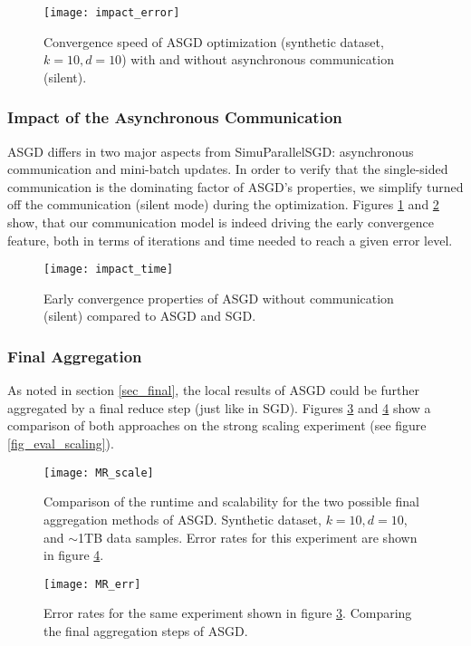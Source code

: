 \documentclass{acm_proc_article-sp}
\begin{document}
\begin{figure}[!ht]
\texttt{[image: impact\_error]}
\caption{Convergence speed of ASGD optimization (synthetic dataset, $k=10,d=10$) 
with and without asynchronous communication (silent). \label{fig_eval_impact_error}}
\end{figure}

\subsubsection*{Impact of the Asynchronous Communication\label{sec_ex_comim}}
ASGD differs in two major aspects from SimuParallelSGD: asynchronous communication and
mini-batch updates. In order to verify that the single-sided communication
is the dominating factor of ASGD's properties, we simplify turned off the 
communication (silent mode) during the optimization. Figures \ref{fig_eval_impact_error}
and \ref{fig_eval_impact_time} show, that our communication model is indeed 
driving the early convergence feature, both in terms of iterations and time needed
to reach a given error level.
\begin{figure}[!ht]
\texttt{[image: impact\_time]}
\caption{Early convergence properties of ASGD without communication (silent) compared
to ASGD and SGD. \label{fig_eval_impact_time}}
\end{figure}

\subsubsection*{Final Aggregation\label{sec_ex_agg}}
As noted in section \ref{sec_final}, the local results of ASGD could be further 
aggregated by a final reduce step (just like in SGD). Figures \ref{fig_eval_MR_scale}
and \ref{fig_eval_MR_err} show a comparison of both approaches on the
strong scaling experiment (see figure \ref{fig_eval_scaling}).  
\begin{figure}[!ht]
\texttt{[image: MR\_scale]}
\caption{Comparison of the runtime and scalability for the 
two possible final aggregation methods of ASGD. 
Synthetic dataset, $k=10,d=10$, and $\sim$1TB data samples. 
Error rates for this experiment
are shown in figure \ref{fig_eval_MR_err}.  
\label{fig_eval_MR_scale}}
\end{figure}

\begin{figure}[!ht]
\texttt{[image: MR\_err]}
\caption{Error rates for the same experiment shown in figure \ref{fig_eval_MR_scale}.
Comparing the final aggregation steps of ASGD. 
\label{fig_eval_MR_err}}
\end{figure}
\end{document}
